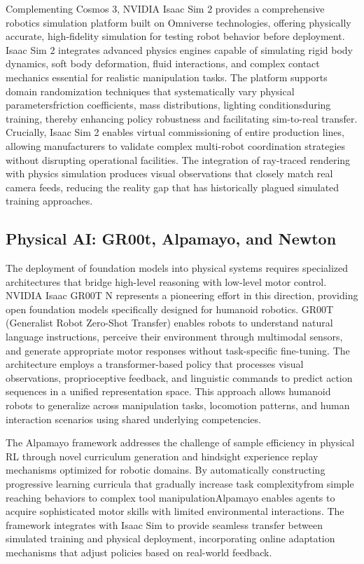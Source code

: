Complementing Cosmos 3, NVIDIA Isaac Sim 2 provides a comprehensive robotics simulation platform built on Omniverse technologies, offering physically accurate, high-fidelity simulation for testing robot behavior before deployment. Isaac Sim 2 integrates advanced physics engines capable of simulating rigid body dynamics, soft body deformation, fluid interactions, and complex contact mechanics essential for realistic manipulation tasks. The platform supports domain randomization techniques that systematically vary physical parametersfriction coefficients, mass distributions, lighting conditionsduring training, thereby enhancing policy robustness and facilitating sim-to-real transfer. Crucially, Isaac Sim 2 enables virtual commissioning of entire production lines, allowing manufacturers to validate complex multi-robot coordination strategies without disrupting operational facilities. The integration of ray-traced rendering with physics simulation produces visual observations that closely match real camera feeds, reducing the reality gap that has historically plagued simulated training approaches.

\subsection{Physical AI: GR00t, Alpamayo, and Newton}

The deployment of foundation models into physical systems requires specialized architectures that bridge high-level reasoning with low-level motor control. NVIDIA Isaac GR00T N represents a pioneering effort in this direction, providing open foundation models specifically designed for humanoid robotics. GR00T (Generalist Robot Zero-Shot Transfer) enables robots to understand natural language instructions, perceive their environment through multimodal sensors, and generate appropriate motor responses without task-specific fine-tuning. The architecture employs a transformer-based policy that processes visual observations, proprioceptive feedback, and linguistic commands to predict action sequences in a unified representation space. This approach allows humanoid robots to generalize across manipulation tasks, locomotion patterns, and human interaction scenarios using shared underlying competencies.

The Alpamayo framework addresses the challenge of sample efficiency in physical RL through novel curriculum generation and hindsight experience replay mechanisms optimized for robotic domains. By automatically constructing progressive learning curricula that gradually increase task complexityfrom simple reaching behaviors to complex tool manipulationAlpamayo enables agents to acquire sophisticated motor skills with limited environmental interactions. The framework integrates with Isaac Sim to provide seamless transfer between simulated training and physical deployment, incorporating online adaptation mechanisms that adjust policies based on real-world feedback.

